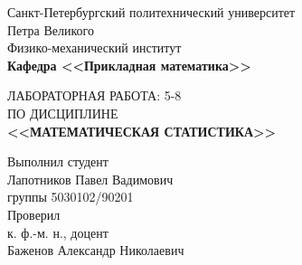 \documentclass[main.tex]{subfiles}
\begin{document}
\begin{titlepage}
\begin{center}
	\begin{large}
		Санкт-Петербургский политехнический университет\\ Петра Великого\\		
		\vspace{\baselineskip}
		Физико-механический институт\\
		\textbf{Кафедра <<Прикладная математика>>}\\
	\end{large}
	\vfill
	\Large{{ЛАБОРАТОРНАЯ РАБОТА: 5-8
	\\ {ПО ДИСЦИПЛИНЕ} \\\textbf{<<МАТЕМАТИЧЕСКАЯ СТАТИСТИКА>>}}}
\end{center}
\vfill
\begin{flushright}	
	Выполнил студент\\
	Лапотников Павел Вадимович\\
	группы 5030102/90201\\
	\vspace{\baselineskip}	
	Проверил\\
	к. ф.-м. н., доцент\\
	Баженов Александр Николаевич
\end{flushright}
\vfill
{}
\end{titlepage}
\end{document}
